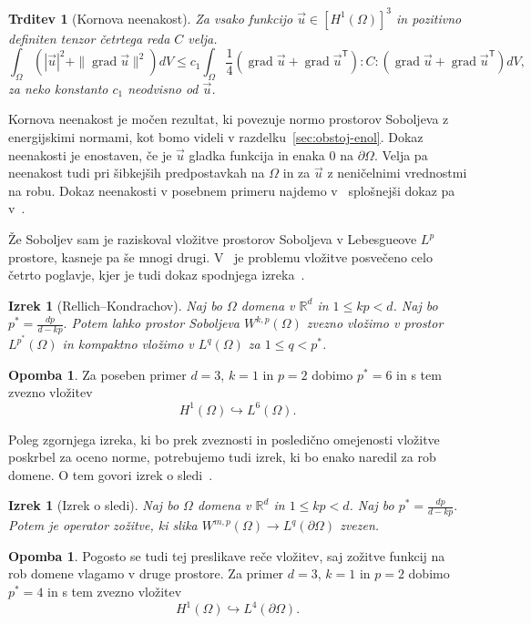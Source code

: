 \documentclass[12pt,a4paper,twoside]{article}
\theoremstyle{definition} %
\newtheorem{opomba}[definicija]{Opomba}
\theoremstyle{plain} %
\newtheorem{izrek}[definicija]{Izrek}
\newtheorem{trditev}[definicija]{Trditev}
\numberwithin{equation}{section}
\newcommand{\R}{\mathbb R}
\newcommand{\T}{\mathsf{T}}
\newcommand{\grad}{\operatorname{grad}}
\newcommand{\vu}{\vec{u}}
\begin{document}
\begin{trditev}[Kornova neenakost]
  \label{trd:korn}
  Za vsako funkcijo $\vu \in [H^1(\Omega)]^3$ in pozitivno definiten tenzor četrtega reda $C$ velja.
  \[ \int_{\Omega} (|\vu|^2 + \|\grad \vu\|^2) dV \leq c_1 \int_{\Omega}
  \frac14 (\grad \vu + \grad \vu^\T) :C: (\grad \vu + \grad \vu^\T)dV, \]
  za neko konstanto $c_1$ neodvisno od $\vu$.
\end{trditev}
Kornova neenakost je močen rezultat, ki povezuje normo prostorov Soboljeva z
energijskimi normami, kot bomo videli v razdelku~\ref{sec:obstoj-enol}. Dokaz neenakosti je
enostaven, če je $\vu$ gladka funkcija in enaka 0 na $\partial\Omega$. Velja pa neenakost tudi pri
šibkejših predpostavkah na $\Omega$ in za $\vu$ z neničelnimi vrednostmi na robu.
Dokaz neenakosti v posebnem primeru najdemo v~\cite[str.\ 229]{lebedev2009introduction} splošnejši
dokaz pa v~\cite{ciarlet2010korn}.

Že Soboljev sam je raziskoval vložitve prostorov Soboljeva v Lebesgueove $L^p$ prostore,
kasneje pa še mnogi drugi. V~\cite{adams2003sobolev} je problemu vložitve posvečeno celo četrto poglavje,
kjer je tudi dokaz spodnjega izreka~\cite[str.\ 85, izrek 4.12]{adams2003sobolev}.
\begin{izrek}[Rellich--Kondrachov]
  \label{izr:vlozitev-sobolj}
  Naj bo $\Omega$ domena v $\R^d$ in $1 \leq kp < d$.  Naj bo $p^\ast = \frac{dp}{d-kp}.$ Potem lahko
  prostor Soboljeva $W^{k,p}(\Omega)$ zvezno vložimo v prostor $L^{p^\ast}(\Omega)$ in kompaktno
  vložimo v $L^q(\Omega)$ za $1 \leq q < p^\ast$.
\end{izrek}
\begin{opomba}
  Za poseben primer $d=3$, $k=1$ in $p=2$ dobimo $p^\ast = 6$ in s tem zvezno vložitev
  \[
    H^1(\Omega) \hookrightarrow L^6(\Omega).
  \]
\end{opomba}
Poleg zgornjega izreka, ki bo prek zveznosti in posledično omejenosti vložitve poskrbel za oceno
norme, potrebujemo tudi izrek, ki bo enako naredil za rob domene. O tem govori izrek o
sledi~\cite[str.\ 164, izrek 5.36]{adams2003sobolev}.
\begin{izrek}[Izrek o sledi]
  \label{izr:soboljev-sled}
  Naj bo $\Omega$ domena v $\R^d$ in $1 \leq kp < d$. Naj bo $p^\ast = \frac{dp}{d-kp}.$  Potem
  je operator zožitve, ki slika $W^{m,p}(\Omega) \to L^q(\partial \Omega)$ zvezen.
\end{izrek}
\begin{opomba}
  Pogosto se tudi tej preslikave reče vložitev, saj zožitve funkcij na rob domene vlagamo v druge
  prostore. Za primer $d=3$, $k=1$ in $p=2$ dobimo $p^\ast = 4$ in s tem zvezno vložitev
  \[
    H^1(\Omega) \hookrightarrow L^4(\partial\Omega).
  \]
\end{opomba}
\end{document}

